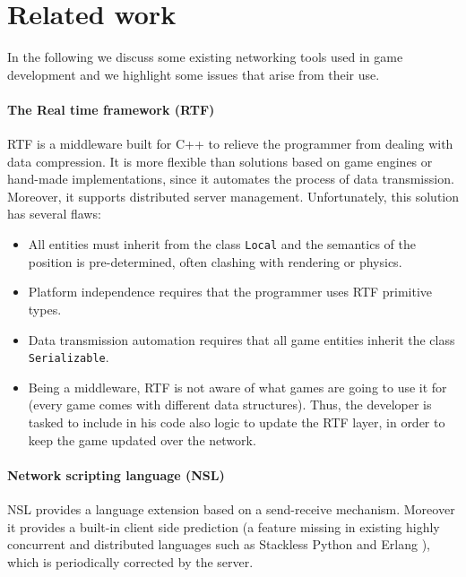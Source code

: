 \section{Related work}
In the following we discuss some existing networking tools used in game development and we highlight some issues that arise from their use.

\paragraph{The Real time framework (RTF)} RTF \cite{glinka2007rtf} is a middleware built for C++ to relieve the programmer from dealing with data compression. It is more flexible than solutions based on game engines or hand-made implementations, since it automates the process of data transmission. Moreover, it supports distributed server management. Unfortunately, this solution has several flaws:
\begin{itemize}
	\item All entities must inherit from the class \texttt{Local} and the semantics of the position is pre-determined, often clashing with rendering or physics.
	\item Platform independence requires that the programmer uses RTF primitive	types.
	\item Data transmission automation requires that all game entities inherit the class \texttt{Serializable}.
	\item Being a middleware, RTF is not aware of what games are going to use it for (every game comes with different data structures). Thus, the developer is tasked to include in his code also logic to update the RTF layer, in order to keep the game updated over the network.
\end{itemize}


\paragraph{Network scripting language (NSL)} NSL \cite{russell2008tackling} provides a language extension based on a send-receive mechanism. Moreover it provides a built-in client side prediction (a feature missing in existing highly concurrent and distributed languages such as Stackless Python \cite{kalogirou2005multithreaded} and Erlang \cite{armstrong1993concurrent}), which is periodically corrected by the server. 


